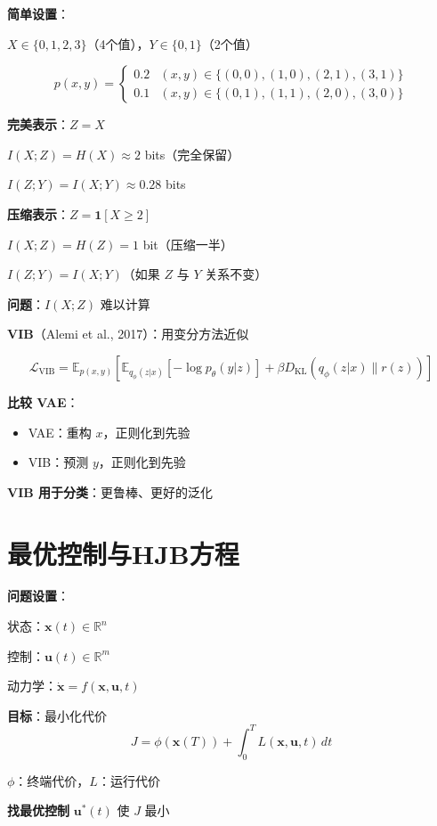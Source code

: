 \documentclass[12pt, a4paper]{ctexart}
\begin{document}
\begin{blackboard}[信息瓶颈的数值例子]

\textbf{简单设置}：

$X \in \{0, 1, 2, 3\}$（4个值），$Y \in \{0, 1\}$（2个值）

\[
p(x, y) = \begin{cases}
0.2 & (x, y) \in \{(0,0), (1,0), (2,1), (3,1)\} \\
0.1 & (x, y) \in \{(0,1), (1,1), (2,0), (3,0)\}
\end{cases}
\]

\textbf{完美表示}：$Z = X$

$I(X; Z) = H(X) \approx 2$ bits（完全保留）

$I(Z; Y) = I(X; Y) \approx 0.28$ bits

\textbf{压缩表示}：$Z = \mathbf{1}[X \geq 2]$

$I(X; Z) = H(Z) = 1$ bit（压缩一半）

$I(Z; Y) = I(X; Y)$（如果 $Z$ 与 $Y$ 关系不变）

\end{blackboard}

\begin{blackboard}

\textbf{问题}：$I(X; Z)$ 难以计算

\textbf{VIB}（Alemi et al., 2017）：用变分方法近似

\[
\mathcal{L}_{\text{VIB}} = \mathbb{E}_{p(x,y)}\left[ \mathbb{E}_{q_\phi(z|x)}[-\log p_\theta(y|z)] + \beta D_{\text{KL}}(q_\phi(z|x) \| r(z)) \right]
\]

\textbf{比较 VAE}：
\begin{itemize}
    \item VAE：重构 $x$，正则化到先验
    \item VIB：预测 $y$，正则化到先验
\end{itemize}

\textbf{VIB 用于分类}：更鲁棒、更好的泛化

\end{blackboard}

\section{最优控制与HJB方程}

\begin{blackboard}[最优控制问题]

\textbf{问题设置}：

状态：$\mathbf{x}(t) \in \mathbb{R}^n$

控制：$\mathbf{u}(t) \in \mathbb{R}^m$

动力学：$\dot{\mathbf{x}} = f(\mathbf{x}, \mathbf{u}, t)$

\textbf{目标}：最小化代价
\[
J = \phi(\mathbf{x}(T)) + \int_0^T L(\mathbf{x}, \mathbf{u}, t) \, dt
\]

$\phi$：终端代价，$L$：运行代价

\textbf{找最优控制} $\mathbf{u}^*(t)$ 使 $J$ 最小

\end{blackboard}
\end{document}
